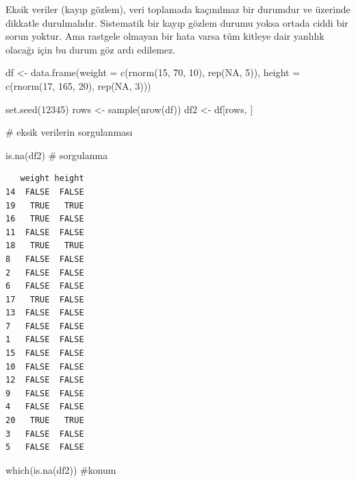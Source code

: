 \documentclass[
  letterpaper,
  DIV=11,
  numbers=noendperiod]{scrreprt}
\newenvironment{Shaded}{\begin{snugshade}}{\end{snugshade}}
\newcommand{\AttributeTok}[1]{\textcolor[rgb]{0.40,0.45,0.13}{#1}}
\newcommand{\CommentTok}[1]{\textcolor[rgb]{0.37,0.37,0.37}{#1}}
\newcommand{\ConstantTok}[1]{\textcolor[rgb]{0.56,0.35,0.01}{#1}}
\newcommand{\DecValTok}[1]{\textcolor[rgb]{0.68,0.00,0.00}{#1}}
\newcommand{\FunctionTok}[1]{\textcolor[rgb]{0.28,0.35,0.67}{#1}}
\newcommand{\NormalTok}[1]{\textcolor[rgb]{0.00,0.23,0.31}{#1}}
\newcommand{\OtherTok}[1]{\textcolor[rgb]{0.00,0.23,0.31}{#1}}
\begin{document}

Eksik veriler (kayıp gözlem), veri toplamada kaçınılmaz bir durumdur ve
üzerinde dikkatle durulmalıdır. Sistematik bir kayıp gözlem durumu yoksa
ortada ciddi bir sorun yoktur. Ama rastgele olmayan bir hata varsa tüm
kitleye dair yanlılık olacağı için bu durum göz ardı edilemez.

\begin{Shaded}
\begin{Highlighting}[]
\NormalTok{df }\OtherTok{\textless{}{-}} \FunctionTok{data.frame}\NormalTok{(}\AttributeTok{weight =} \FunctionTok{c}\NormalTok{(}\FunctionTok{rnorm}\NormalTok{(}\DecValTok{15}\NormalTok{, }\DecValTok{70}\NormalTok{, }\DecValTok{10}\NormalTok{), }\FunctionTok{rep}\NormalTok{(}\ConstantTok{NA}\NormalTok{, }\DecValTok{5}\NormalTok{)),}
                 \AttributeTok{height =} \FunctionTok{c}\NormalTok{(}\FunctionTok{rnorm}\NormalTok{(}\DecValTok{17}\NormalTok{, }\DecValTok{165}\NormalTok{, }\DecValTok{20}\NormalTok{), }\FunctionTok{rep}\NormalTok{(}\ConstantTok{NA}\NormalTok{, }\DecValTok{3}\NormalTok{)))}

\FunctionTok{set.seed}\NormalTok{(}\DecValTok{12345}\NormalTok{)}
\NormalTok{rows }\OtherTok{\textless{}{-}} \FunctionTok{sample}\NormalTok{(}\FunctionTok{nrow}\NormalTok{(df))}
\NormalTok{df2 }\OtherTok{\textless{}{-}}\NormalTok{ df[rows, ]}

\CommentTok{\# eksik verilerin sorgulanması}

\FunctionTok{is.na}\NormalTok{(df2) }\CommentTok{\# sorgulanma}
\end{Highlighting}
\end{Shaded}

\begin{verbatim}
   weight height
14  FALSE  FALSE
19   TRUE   TRUE
16   TRUE  FALSE
11  FALSE  FALSE
18   TRUE   TRUE
8   FALSE  FALSE
2   FALSE  FALSE
6   FALSE  FALSE
17   TRUE  FALSE
13  FALSE  FALSE
7   FALSE  FALSE
1   FALSE  FALSE
15  FALSE  FALSE
10  FALSE  FALSE
12  FALSE  FALSE
9   FALSE  FALSE
4   FALSE  FALSE
20   TRUE   TRUE
3   FALSE  FALSE
5   FALSE  FALSE
\end{verbatim}

\begin{Shaded}
\begin{Highlighting}[]
\FunctionTok{which}\NormalTok{(}\FunctionTok{is.na}\NormalTok{(df2)) }\CommentTok{\#konum}
\end{Highlighting}
\end{Shaded}
\end{document}
